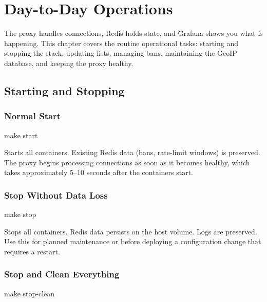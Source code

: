 
\chapter{Day-to-Day Operations}
\label{ch:operations}

 The proxy handles
connections, Redis holds state, and Grafana shows you what is happening. This
chapter covers the routine operational tasks: starting and stopping the stack,
updating lists, managing bans, maintaining the GeoIP database, and keeping
the proxy healthy.

\section{Starting and Stopping}

\subsection{Normal Start}

\begin{bashcode}
make start
\end{bashcode}

Starts all containers. Existing Redis data (bans, rate-limit windows) is preserved.
The proxy begins processing connections as soon as it becomes healthy, which
takes approximately 5--10 seconds after the containers start.

\subsection{Stop Without Data Loss}

\begin{bashcode}
make stop
\end{bashcode}

Stops all containers. Redis data persists on the host volume. Logs are preserved.
Use this for planned maintenance or before deploying a configuration change
that requires a restart.

\subsection{Stop and Clean Everything}

\begin{bashcode}
make stop-clean
\end{bashcode}

